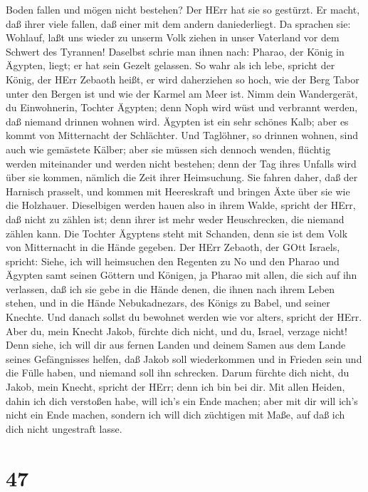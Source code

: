 Boden fallen und mögen nicht bestehen? Der HErr hat sie so gestürzt.
 Er macht, daß ihrer viele fallen, daß einer mit dem andern
daniederliegt. Da sprachen sie: Wohlauf, laßt uns wieder zu unserm Volk
ziehen in unser Vaterland vor dem Schwert des Tyrannen! 
Daselbst schrie man ihnen nach: Pharao, der König in Ägypten, liegt; er
hat sein Gezelt gelassen.  So wahr als ich lebe, spricht
der König, der HErr Zebaoth heißt, er wird daherziehen so hoch, wie der
Berg Tabor unter den Bergen ist und wie der Karmel am Meer ist.
 Nimm dein Wandergerät, du Einwohnerin, Tochter Ägypten;
denn Noph wird wüst und verbrannt werden, daß niemand drinnen wohnen
wird.  Ägypten ist ein sehr schönes Kalb; aber es kommt von
Mitternacht der Schlächter.  Und Taglöhner, so drinnen
wohnen, sind auch wie gemästete Kälber; aber sie müssen sich dennoch
wenden, flüchtig werden miteinander und werden nicht bestehen; denn der
Tag ihres Unfalls wird über sie kommen, nämlich die Zeit ihrer
Heimsuchung.  Sie fahren daher, daß der Harnisch prasselt,
und kommen mit Heereskraft und bringen Äxte über sie wie die Holzhauer.
 Dieselbigen werden hauen also in ihrem Walde, spricht der
HErr, daß nicht zu zählen ist; denn ihrer ist mehr weder Heuschrecken,
die niemand zählen kann.  Die Tochter Ägyptens steht mit
Schanden, denn sie ist dem Volk von Mitternacht in die Hände gegeben.
 Der HErr Zebaoth, der GOtt Israels, spricht: Siehe, ich
will heimsuchen den Regenten zu No und den Pharao und Ägypten samt
seinen Göttern und Königen, ja Pharao mit allen, die sich auf ihn
verlassen,  daß ich sie gebe in die Hände denen, die ihnen
nach ihrem Leben stehen, und in die Hände Nebukadnezars, des Königs zu
Babel, und seiner Knechte. Und danach sollst du bewohnet werden wie vor
alters, spricht der HErr.  Aber du, mein Knecht Jakob,
fürchte dich nicht, und du, Israel, verzage nicht! Denn siehe, ich will
dir aus fernen Landen und deinem Samen aus dem Lande seines Gefängnisses
helfen, daß Jakob soll wiederkommen und in Frieden sein und die Fülle
haben, und niemand soll ihn schrecken.  Darum fürchte dich
nicht, du Jakob, mein Knecht, spricht der HErr; denn ich bin bei dir.
Mit allen Heiden, dahin ich dich verstoßen habe, will ich's ein Ende
machen; aber mit dir will ich's nicht ein Ende machen, sondern ich will
dich züchtigen mit Maße, auf daß ich dich nicht ungestraft lasse.

\hypertarget{section-46}{%
\section{47}\label{section-46}}

